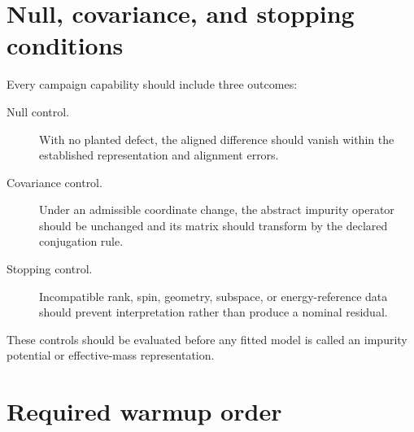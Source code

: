 \section{Null, covariance, and stopping conditions}

Every campaign capability should include three outcomes:
\begin{description}
    \item[Null control.] With no planted defect, the aligned difference should
      vanish within the established representation and alignment errors.
    \item[Covariance control.] Under an admissible coordinate change, the
      abstract impurity operator should be unchanged and its matrix should
      transform by the declared conjugation rule.
    \item[Stopping control.] Incompatible rank, spin, geometry, subspace, or
      energy-reference data should prevent interpretation rather than produce a
      nominal residual.
\end{description}
These controls should be evaluated before any fitted model is called an
impurity potential or effective-mass representation.

\section{Required warmup order}

